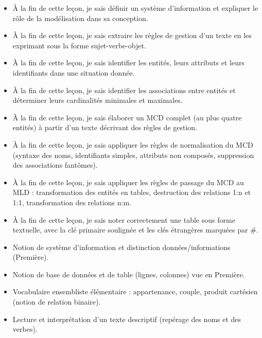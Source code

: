 \documentclass[11pt]{article}
\begin{document}
\begin{objectifs}
\begin{itemize}
\item À la fin de cette leçon, je sais définir un système d'information et expliquer le rôle de la modélisation dans sa conception.
\item À la fin de cette leçon, je sais extraire les règles de gestion d'un texte en les exprimant sous la forme sujet-verbe-objet.
\item À la fin de cette leçon, je sais identifier les entités, leurs attributs et leurs identifiants dans une situation donnée.
\item À la fin de cette leçon, je sais identifier les associations entre entités et déterminer leurs cardinalités minimales et maximales.
\item À la fin de cette leçon, je sais élaborer un MCD complet (au plus quatre entités) à partir d'un texte décrivant des règles de gestion.
\item À la fin de cette leçon, je sais appliquer les règles de normalisation du MCD (syntaxe des noms, identifiants simples, attributs non composés, suppression des associations fantômes).
\item À la fin de cette leçon, je sais appliquer les règles de passage du MCD au MLD : transformation des entités en tables, destruction des relations 1:n et 1:1, transformation des relations n:m.
\item À la fin de cette leçon, je sais noter correctement une table sous forme textuelle, avec la clé primaire soulignée et les clés étrangères marquées par \#.
\end{itemize}
\end{objectifs}

\begin{prerequis}
\begin{itemize}
\item Notion de système d'information et distinction données/informations (Première).
\item Notion de base de données et de table (lignes, colonnes) vue en Première.
\item Vocabulaire ensembliste élémentaire : appartenance, couple, produit cartésien (notion de relation binaire).
\item Lecture et interprétation d'un texte descriptif (repérage des noms et des verbes).
\end{itemize}
\end{prerequis}

\newpage
\end{document}
